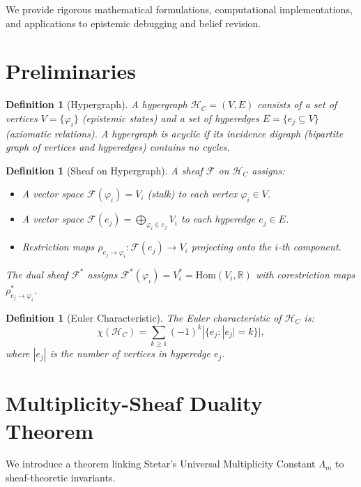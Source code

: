 \documentclass[12pt]{article}
\newtheorem{definition}[theorem]{Definition}
\begin{document}
We provide rigorous mathematical formulations, computational implementations, and applications to epistemic debugging and belief revision.

\section{Preliminaries}
\begin{definition}[Hypergraph]
A hypergraph \(\mathcal{H}_C = (V, E)\) consists of a set of vertices \(V = \{\varphi_i\}\) (epistemic states) and a set of hyperedges \(E = \{e_j \subseteq V\}\) (axiomatic relations). A hypergraph is \emph{acyclic} if its incidence digraph (bipartite graph of vertices and hyperedges) contains no cycles.
\end{definition}

\begin{definition}[Sheaf on Hypergraph]
A sheaf \(\mathcal{F}\) on \(\mathcal{H}_C\) assigns:
\begin{itemize}
    \item A vector space \(\mathcal{F}(\varphi_i) = V_i\) (stalk) to each vertex \(\varphi_i \in V\).
    \item A vector space \(\mathcal{F}(e_j) = \bigoplus_{\varphi_i \in e_j} V_i\) to each hyperedge \(e_j \in E\).
    \item Restriction maps \(\rho_{e_j \to \varphi_i}: \mathcal{F}(e_j) \to V_i\) projecting onto the \(i\)-th component.
\end{itemize}
The dual sheaf \(\mathcal{F}^\ast\) assigns \(\mathcal{F}^\ast(\varphi_i) = V_i^\ast = \text{Hom}(V_i, \mathbb{R})\) with corestriction maps \(\rho^\ast_{e_j \to \varphi_i}\).
\end{definition}

\begin{definition}[Euler Characteristic]
The Euler characteristic of \(\mathcal{H}_C\) is:
\[
\chi(\mathcal{H}_C) = \sum_{k \geq 1} (-1)^k |\{e_j : |e_j| = k\}|,
\]
where \(|e_j|\) is the number of vertices in hyperedge \(e_j\).
\end{definition}

\section{Multiplicity-Sheaf Duality Theorem}
We introduce a theorem linking Stetar's Universal Multiplicity Constant \(\Lambda_m\) to sheaf-theoretic invariants.
\end{document}
